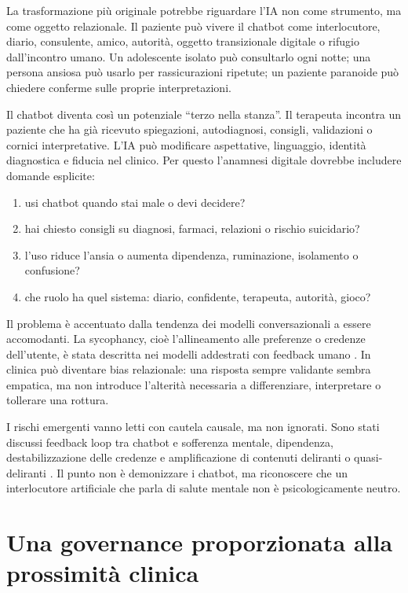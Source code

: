 \documentclass[utf8]{FrontiersinHarvard}
\begin{document}
La trasformazione pi\`u originale potrebbe riguardare l'\ac{IA} non come strumento, ma come oggetto relazionale. Il paziente pu\`o vivere il chatbot come interlocutore, diario, consulente, amico, autorit\`a, oggetto transizionale digitale o rifugio dall'incontro umano. Un adolescente isolato pu\`o consultarlo ogni notte; una persona ansiosa pu\`o usarlo per rassicurazioni ripetute; un paziente paranoide pu\`o chiedere conferme sulle proprie interpretazioni.

Il chatbot diventa cos\`i un potenziale ``terzo nella stanza''. Il terapeuta incontra un paziente che ha gi\`a ricevuto spiegazioni, autodiagnosi, consigli, validazioni o cornici interpretative. L'\ac{IA} pu\`o modificare aspettative, linguaggio, identit\`a diagnostica e fiducia nel clinico. Per questo l'anamnesi digitale dovrebbe includere domande esplicite:

\begin{enumerate}
\setlength{\itemsep}{2pt}
\item usi chatbot quando stai male o devi decidere?
\item hai chiesto consigli su diagnosi, farmaci, relazioni o rischio suicidario?
\item l'uso riduce l'ansia o aumenta dipendenza, ruminazione, isolamento o confusione?
\item che ruolo ha quel sistema: diario, confidente, terapeuta, autorit\`a, gioco?
\end{enumerate}

Il problema \`e accentuato dalla tendenza dei modelli conversazionali a essere accomodanti. La sycophancy, cio\`e l'allineamento alle preferenze o credenze dell'utente, \`e stata descritta nei modelli addestrati con feedback umano \citep{sharma2023sycophancy}. In clinica pu\`o diventare bias relazionale: una risposta sempre validante sembra empatica, ma non introduce l'alterit\`a necessaria a differenziare, interpretare o tollerare una rottura.

I rischi emergenti vanno letti con cautela causale, ma non ignorati. Sono stati discussi feedback loop tra chatbot e sofferenza mentale, dipendenza, destabilizzazione delle credenze e amplificazione di contenuti deliranti o quasi-deliranti \citep{hudon2025,morrin2026,dohnany2026}. Il punto non \`e demonizzare i chatbot, ma riconoscere che un interlocutore artificiale che parla di salute mentale non \`e psicologicamente neutro.

\section{Una governance proporzionata alla prossimit\`a clinica}
\label{sec:governance}
\end{document}
